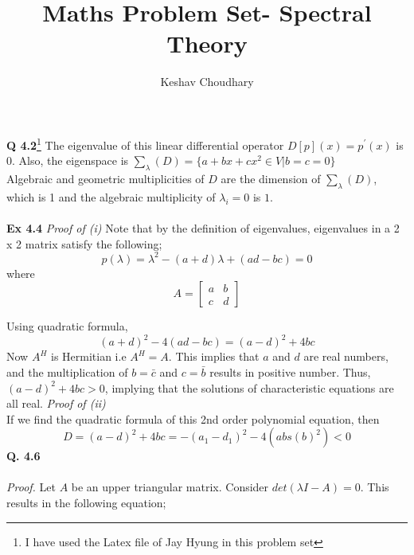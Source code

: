 \documentclass[letterpaper,12pt]{article}
\title{Maths Problem Set- Spectral Theory}
\author{Keshav Choudhary}
\theoremstyle{definition}
\begin{document}
  \maketitle {}
  \author{}
  \date{}

\textbf{Q 4.2}\footnote{I have used the Latex file of Jay Hyung in this problem set}
The eigenvalue of this linear differential operator $D[p](x) = p^{'} (x)$ is $0$. Also, the eigenspace is $ \sum_{\lambda}(D) = \{a + bx + c x^2 \in V | b=c=0\}$ \\
Algebraic and geometric multiplicities of $D$ are the dimension of $ \sum_{\lambda}(D)$, which is 1 and the algebraic multiplicity of $\lambda_i = 0$ is $1$. \\\\
\textbf{Ex 4.4}
\emph{Proof of (i) }
Note that by the definition of eigenvalues, eigenvalues in a 2 x 2 matrix satisfy the following;
\[p(\lambda)  = \lambda^2 - (a+d) \lambda + (ad - bc) = 0\]
where
\[A= \begin{bmatrix}
  a & b \\
  c & d
\end{bmatrix}\]

Using quadratic formula,
\[(a+d)^2 - 4(ad - bc) = (a-d)^2 + 4bc \]
Now $A^H$ is Hermitian i.e $A^H = A$. This implies that $a$ and $d$ are real numbers, and the multiplication of $b=\bar{c}$ and $c=\bar{b}$ results in positive number. Thus, $(a-d)^2 + 4bc >0$, implying that the solutions of characteristic equations are all real.
\newline
\emph{Proof of (ii)} \\
If we find the quadratic formula of this 2nd order polynomial equation, then
\[D = (a-d)^2 + 4bc = -(a_1 - d_1)^2 - 4(abs(b)^2) < 0 \]
\newline
\textbf{Q. 4.6} \\\\
\emph{Proof.} Let $A$ be an upper triangular matrix. Consider $det(\lambda I - A) = 0 $. This results in the following equation;
\end{document}
